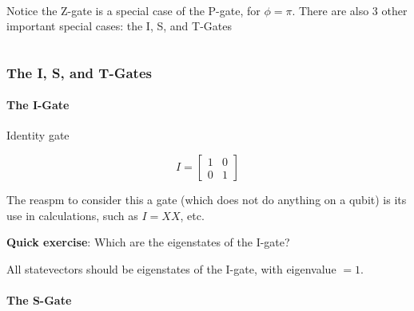 \documentclass[11pt]{article}
\makeatletter
\newcommand{\boxspacing}{\kern\kvtcb@left@rule\kern\kvtcb@boxsep}
\newcommand{\prompt}[4]{
        {\ttfamily\llap{{\color{#2}[#3]:\hspace{3pt}#4}}\vspace{-\baselineskip}}
    }
\makeatother
\begin{document}
            
\prompt{Out}{outcolor}{60}{}
    
    \begin{center}
    \end{center}
    { \hspace*{\fill} \\}
    

    Notice the Z-gate is a special case of the P-gate, for \(\phi=\pi\).
There are also 3 other important special cases: the I, S, and T-Gates

    \begin{tcolorbox}[breakable, size=fbox, boxrule=1pt, pad at break*=1mm,colback=cellbackground, colframe=cellborder]
\prompt{In}{incolor}{ }{\boxspacing}
\begin{Verbatim}[commandchars=\\\{\}]

\end{Verbatim}
\end{tcolorbox}

    \hypertarget{the-i-s-and-t-gates}{%
\subsubsection{The I, S, and T-Gates}\label{the-i-s-and-t-gates}}

    \hypertarget{the-i-gate}{%
\paragraph{The I-Gate}\label{the-i-gate}}

    Identity gate

\[
I = 
\begin{bmatrix}
1 & 0\\
0 & 1
\end{bmatrix}
\]

    The reaspm to consider this a gate (which does not do anything on a
qubit) is its use in calculations, such as \(I=XX\), etc.

\textbf{Quick exercise}: Which are the eigenstates of the I-gate?

All statevectors should be eigenstates of the I-gate, with eigenvalue
\(=1\).

    \hypertarget{the-s-gate}{%
\paragraph{The S-Gate}\label{the-s-gate}}
\end{document}
